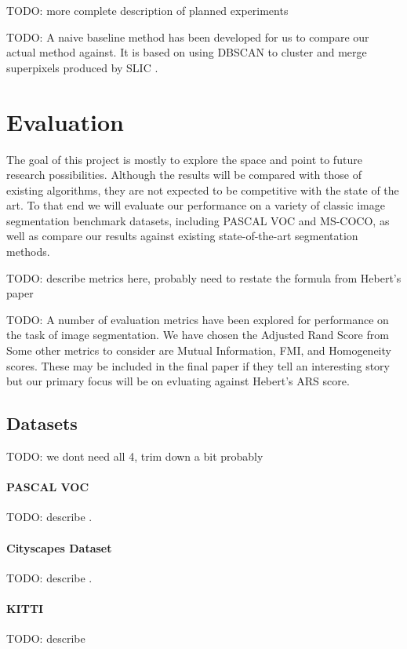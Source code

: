 \documentclass[twocolumn]{article}
\newcommand{\todo}[1]{}
\renewcommand{\todo}[1]{{\color{red} TODO: {#1}}}
\newcommand{\seclab}[1]{\label{sec:#1}}
\begin{document}
\todo{more complete description of planned experiments}

\todo{
A naive baseline method has been developed for us to compare our actual method against. It is based on using DBSCAN
\cite{ester1996density} to cluster and merge superpixels produced by SLIC \cite{achanta2010slic}.
}

\section{Evaluation}\seclab{eval}

The goal of this project is mostly to explore the space and point to future research possibilities. Although the results will
be compared with those of existing algorithms, they are not expected to be competitive with the state of the art. To that end
we will evaluate our performance on a variety of classic image segmentation benchmark datasets, including PASCAL VOC and
MS-COCO, as well as compare our results against existing state-of-the-art segmentation methods. 

\todo{describe metrics here, probably need to restate the formula from Hebert's paper}

\todo{
A number of evaluation metrics have been explored for performance on the task of image segmentation. We have chosen the
Adjusted Rand Score from \cite{unnikrishnan2005measure}  Some other metrics to consider are Mutual Information, FMI, and
Homogeneity scores. These may be included in the final paper if they tell an interesting story but our primary focus will be
on evluating against Hebert's ARS score.
}

\subsection{Datasets}\seclab{data}

\todo{we dont need all 4, trim down a bit probably}

\paragraph{PASCAL VOC} \todo{describe} \cite{Everingham10}.

\paragraph{Cityscapes Dataset} \todo{describe} \cite{cordts2016cityscapes}.

\paragraph{KITTI} \todo{describe} \cite{geiger2012we}
\end{document}
